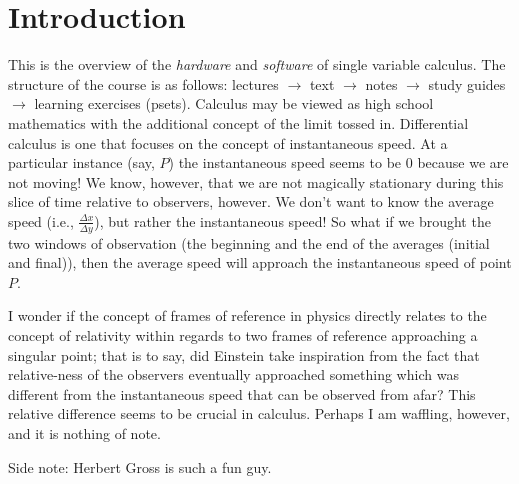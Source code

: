 \documentclass{article}
\begin{document}

\section{Introduction}

This is the overview of the \textit{hardware} and \textit{software} of single variable calculus. The structure of the course is as follows: lectures $\longrightarrow $ text \( \longrightarrow  \) notes \( \longrightarrow  \) study guides \( \longrightarrow  \) learning exercises (psets). Calculus may be viewed as high school mathematics with the additional concept of the limit tossed in. Differential calculus is one that focuses on the concept of instantaneous speed. At a particular instance (say, \( P \)) the instantaneous speed seems to be $0$ because we are not moving! We know, however, that we are not magically stationary during this slice of time relative to observers, however. We don't want to know the average speed (i.e., \( \frac{\Delta x}{\Delta y} \)), but rather the instantaneous speed! So what if we brought the two windows of observation (the beginning and the end of the averages (initial and final)), then the average speed will approach the instantaneous speed of point \( P \). 

I wonder if the concept of frames of reference in physics directly relates to the concept of relativity within regards to two frames of reference approaching a singular point; that is to say, did Einstein take inspiration from the fact that relative-ness of the observers eventually approached something which was different from the instantaneous speed that can be observed from afar? This relative difference seems to be crucial in calculus. Perhaps I am waffling, however, and it is nothing of note. 

Side note: Herbert Gross is such a fun guy.

\end{document}
